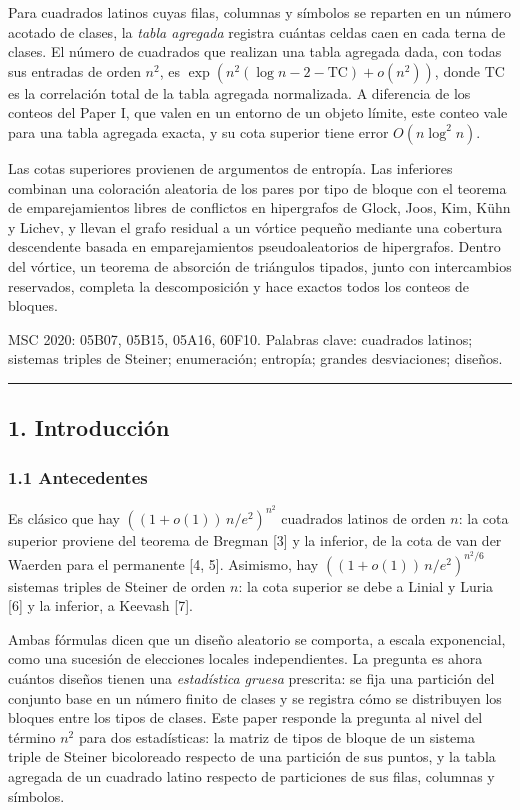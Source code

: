 \documentclass[spanish,11pt,a4paper]{article}
\begin{document}
Para cuadrados latinos cuyas filas, columnas y símbolos se reparten en un número acotado de clases, la \emph{tabla agregada} registra cuántas celdas caen en cada terna de clases. El número de cuadrados que realizan una tabla agregada dada, con todas sus entradas de orden \(n^2\), es \(\exp(n^2(\log n-2-\mathrm{TC})+o(n^2))\), donde \(\mathrm{TC}\) es la correlación total de la tabla agregada normalizada. A diferencia de los conteos del Paper I, que valen en un entorno de un objeto límite, este conteo vale para una tabla agregada exacta, y su cota superior tiene error \(O(n\log^2 n)\).

Las cotas superiores provienen de argumentos de entropía. Las inferiores combinan una coloración aleatoria de los pares por tipo de bloque con el teorema de emparejamientos libres de conflictos en hipergrafos de Glock, Joos, Kim, Kühn y Lichev, y llevan el grafo residual a un vórtice pequeño mediante una cobertura descendente basada en emparejamientos pseudoaleatorios de hipergrafos. Dentro del vórtice, un teorema de absorción de triángulos tipados, junto con intercambios reservados, completa la descomposición y hace exactos todos los conteos de bloques.

MSC 2020: 05B07, 05B15, 05A16, 60F10. Palabras clave: cuadrados latinos; sistemas triples de Steiner; enumeración; entropía; grandes desviaciones; diseños.

\begin{center}\rule{0.5\linewidth}{0.5pt}\end{center}

\subsection{1. Introducción}\label{introducciuxf3n}

\subsubsection{1.1 Antecedentes}\label{antecedentes}

Es clásico que hay \(((1+o(1))\,n/e^2)^{n^2}\) cuadrados latinos de orden \(n\): la cota superior proviene del teorema de Bregman {[}3{]} y la inferior, de la cota de van der Waerden para el permanente {[}4, 5{]}. Asimismo, hay \(((1+o(1))\,n/e^2)^{n^2/6}\) sistemas triples de Steiner de orden \(n\): la cota superior se debe a Linial y Luria {[}6{]} y la inferior, a Keevash {[}7{]}.

Ambas fórmulas dicen que un diseño aleatorio se comporta, a escala exponencial, como una sucesión de elecciones locales independientes. La pregunta es ahora cuántos diseños tienen una \emph{estadística gruesa} prescrita: se fija una partición del conjunto base en un número finito de clases y se registra cómo se distribuyen los bloques entre los tipos de clases. Este paper responde la pregunta al nivel del término \(n^2\) para dos estadísticas: la matriz de tipos de bloque de un sistema triple de Steiner bicoloreado respecto de una partición de sus puntos, y la tabla agregada de un cuadrado latino respecto de particiones de sus filas, columnas y símbolos.
\end{document}
